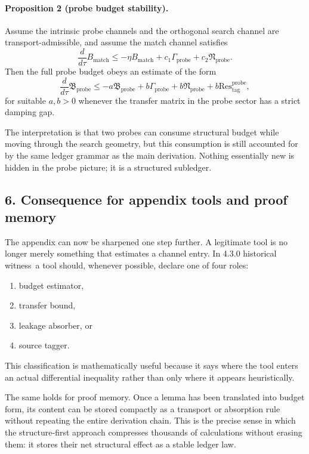 \documentclass[12pt,a4paper]{article}
\newcommand{\docversion}{4.3.0 historical witness}
\begin{document}
\paragraph{Proposition 2 (probe budget stability).}
Assume the intrinsic probe channels and the orthogonal search channel are
transport-admissible, and assume the match channel satisfies
\[
\frac{d}{d\tau}B_{\mathrm{match}}
\le -\eta B_{\mathrm{match}} + c_1\Gamma_{\mathrm{probe}} + c_2\mathfrak N_{\mathrm{probe}}.
\]
Then the full probe budget obeys an estimate of the form
\[
\frac{d}{d\tau}\mathfrak B_{\mathrm{probe}}
\le -a\mathfrak B_{\mathrm{probe}} + b\Gamma_{\mathrm{probe}} + b\mathfrak N_{\mathrm{probe}} + b\mathrm{Res}^{\mathrm{probe}}_{\mathrm{tag}},
\]
for suitable $a,b>0$ whenever the transfer matrix in the probe sector has a
strict damping gap.

The interpretation is that two probes can consume structural budget while moving
through the search geometry, but this consumption is still accounted for by the
same ledger grammar as the main derivation. Nothing essentially new is hidden in
the probe picture; it is a structured subledger.

\subsection*{6. Consequence for appendix tools and proof memory}
The appendix can now be sharpened one step further. A legitimate tool is no longer
merely something that estimates a channel entry. In \docversion\ a tool should,
whenever possible, declare one of four roles:
\begin{enumerate}[label=(\alph*)]
 \item budget estimator,
 \item transfer bound,
 \item leakage absorber, or
 \item source tagger.
\end{enumerate}
This classification is mathematically useful because it says where the tool enters
an actual differential inequality rather than only where it appears heuristically.

The same holds for proof memory. Once a lemma has been translated into budget form,
its content can be stored compactly as a transport or absorption rule without
repeating the entire derivation chain. This is the precise sense in which the
structure-first approach compresses thousands of calculations without erasing them:
it stores their net structural effect as a stable ledger law.
\end{document}
